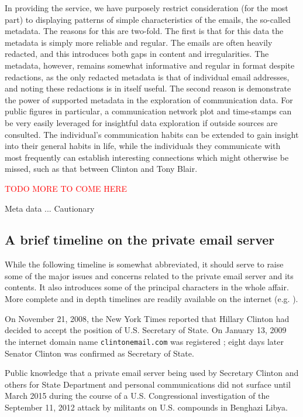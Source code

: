\documentclass[journal]{vgtc}                %
\newcommand*{\TODO}[1]{\textcolor{red}{TODO #1}}
\begin{document}
In providing the service, we have purposely restrict consideration (for the most part) to displaying patterns of simple characteristics of the emails, the so-called metadata. The reasons for this are two-fold. The first is that for this data the metadata is simply more reliable and regular. The emails are often heavily redacted, and this introduces both gaps in content and irregularities. The metadata, however, remains somewhat informative and regular in format despite redactions, as the only redacted metadata is that of individual email addresses, and noting these redactions is in itself useful. The second reason is demonstrate the power of supported metadata in the exploration of communication data. For public figures in particular, a communication network plot and time-stamps can be very easily leveraged for insightful data exploration if outside sources are consulted. The individual's communication habits can be extended to gain insight into their general habits in life, while the individuals they communicate with most frequently can establish interesting connections which might otherwise be missed, such as that between Clinton and Tony Blair.


\TODO{MORE TO COME HERE}

Meta data ...  Cautionary

\subsection{A brief timeline on the private email server}
While the following timeline is somewhat abbreviated, it should serve to raise some of the major issues and concerns related to the private email server and its contents.  It also introduces some of the principal characters in the whole affair.  More complete and in depth timelines are readily available on the internet (e.g. \cite{attkissonTimeline, thompsonTimeline, WashPostTimeline, clintonWikipedia, TimeMagEverything}).

On November 21, 2008, the New York Times reported that Hillary Clinton had decided to accept the position of U.S. Secretary of State.  On January 13, 2009 the internet domain name \texttt{clintonemail.com} was registered \cite{whoisClintonserver}; eight days later Senator Clinton was confirmed as Secretary of State.  

Public knowledge that a private email server being used by Secretary Clinton and others for State Department and personal communications did not surface until March 2015 \cite{NewYorkTimes2015} during the course of a U.S. Congressional investigation \cite{BenghaziReport} of the September 11, 2012 attack by militants on U.S. compounds in Benghazi Libya.  
\end{document}
